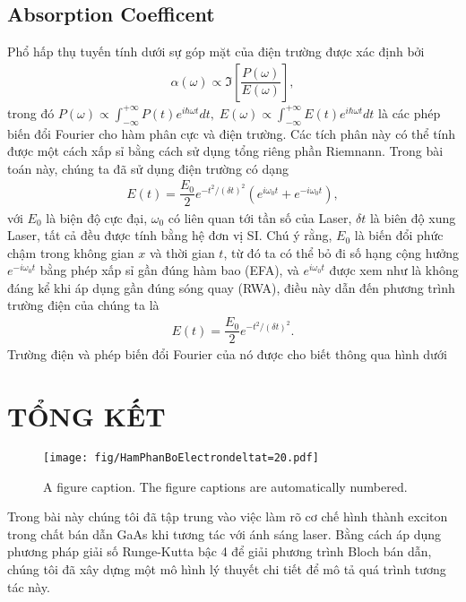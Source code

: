 \documentclass[%
 reprint,
 amsmath,amssymb,
 aps,
]{revtex4-2}
\newcommand{\f}[2]{\dfrac{#1}{#2}}
\newcommand{\image}[1]{
	\begin{center}
		\texttt{[image: fig/\#1]}
	\end{center}
}
\begin{document}
\subsection{Absorption Coefficent}
Phổ hấp thụ tuyến tính dưới sự góp mặt của điện trường được xác định bởi \cite{doi:10.1142/7184}
\begin{gather}
	\alpha(\omega) \propto \Im\left[\f{P(\omega)}{E(\omega)}\right],
\end{gather}
trong đó $P(\omega) \propto \int_{-\infty}^{+\infty} P(t) e^{i \hbar \omega t} dt, \; E(\omega) \propto \int_{-\infty}^{+\infty} E(t) e^{i \hbar \omega t} dt$ là các phép biến đổi Fourier cho hàm phân cực và điện trường. Các tích phân này có thể tính được một cách xấp sỉ bằng cách sử dụng tổng riêng phần Riemnann. Trong bài toán này, chúng ta đã sử dụng điện trường có dạng
\begin{gather}
	E(t) = \f{E_{0}}{2} e^{- t^{2} / (\delta t)^{2}} (e^{i\omega_{0} t} + e^{-i\omega_{0} t}),
\end{gather}
với $E_{0}$ là biện độ cực đại, $\omega_{0}$ có liên quan tới tần số của Laser, $\delta t$ là biên độ xung Laser, tất cả đều được tính bằng hệ đơn vị SI. Chú ý rằng, $E_{0}$ là biến đổi phức chậm trong không gian $x$ và thời gian $t$, từ đó ta có thể bỏ đi số hạng cộng hưởng $e^{-i \omega_{0} t}$ bằng phép xấp sỉ gần đúng hàm bao (EFA), và $e^{i \omega_{0} t}$ được xem như là không đáng kể khi áp dụng gần đúng sóng quay (RWA), điều này dẫn đến phương trình trường điện của chúng ta là
\begin{gather}
	E(t) = \f{E_{0}}{2} e^{-t^{2} / (\delta t)^{2}}.
\end{gather}
Trường điện và phép biến đổi Fourier của nó được cho biết thông qua hình dưới \cite{simon2013oxford} \cite{PhysRevLett.108.196802}

\section{\label{sec:level4} TỔNG KẾT}
\begin{figure}[htb]
	\texttt{[image: fig/HamPhanBoElectrondeltat=20.pdf]}
	\caption{\label{fig:epsart} A figure caption. The figure captions are
		automatically numbered.}
\end{figure}
Trong bài này chúng tôi đã tập trung vào việc làm rõ cơ chế hình thành exciton trong chất bán dẫn GaAs khi tương tác với ánh sáng laser. Bằng cách áp dụng phương pháp giải số Runge-Kutta bậc 4 để giải phương trình Bloch bán dẫn, chúng tôi đã xây dựng một mô hình lý thuyết chi tiết để mô tả quá trình tương tác này.
\end{document}
